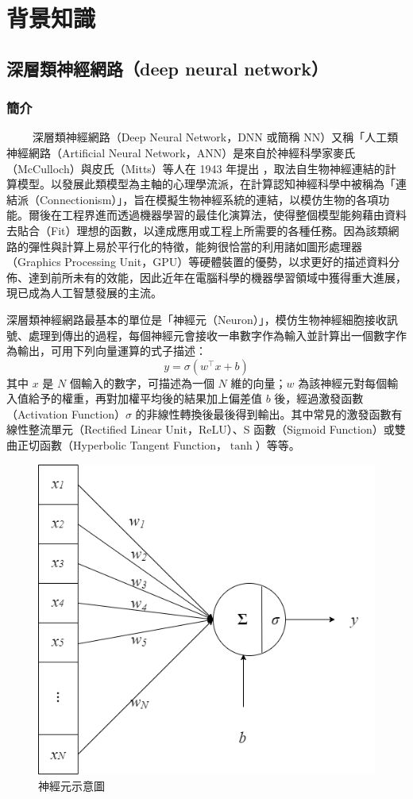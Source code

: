 \chapter{背景知識}

\section{深層類神經網路（deep neural network）}

\subsection{簡介}  %
　　
深層類神經網路（Deep Neural Network，DNN 或簡稱 NN）又稱「人工類神經網路（Artificial Neural Network，ANN）是來自於神經科學家麥氏（McCulloch）與皮氏（Mitts）等人在 1943 年提出 \cite{mcculloch1943logical}，取法自生物神經連結的計算模型。以發展此類模型為主軸的心理學流派，在計算認知神經科學中被稱為「連結派（Connectionism）」，旨在模擬生物神經系統的連結，以模仿生物的各項功能。爾後在工程界進而透過機器學習的最佳化演算法，使得整個模型能夠藉由資料去貼合（Fit）理想的函數，以達成應用或工程上所需要的各種任務。因為該類網路的彈性與計算上易於平行化的特徵，能夠很恰當的利用諸如圖形處理器（Graphics Processing Unit，GPU）等硬體裝置的優勢，以求更好的描述資料分佈、達到前所未有的效能，因此近年在電腦科學的機器學習領域中獲得重大進展，現已成為人工智慧發展的主流。

深層類神經網路最基本的單位是「神經元（Neuron）」，模仿生物神經細胞接收訊號、處理到傳出的過程，每個神經元會接收一串數字作為輸入並計算出一個數字作為輸出，可用下列向量運算的式子描述：
$$y=\sigma(w^\top x + b) $$
其中 $x$ 是 $N$ 個輸入的數字，可描述為一個 $N$ 維的向量；$w$ 為該神經元對每個輸入值給予的權重，再對加權平均後的結果加上偏差值 $b$ 後，經過激發函數（Activation Function）$\sigma$ 的非線性轉換後最後得到輸出。其中常見的激發函數有線性整流單元（Rectified Linear Unit，ReLU）、S 函數（Sigmoid Function）或雙曲正切函數（Hyperbolic Tangent Function，$\tanh$）等等。

\begin{figure}
    \centering
    \includegraphics[width=0.5\linewidth]{figures/neuron.drawio.png}
    \caption{神經元示意圖}
    \label{fig:single-neuron}
\end{figure}

